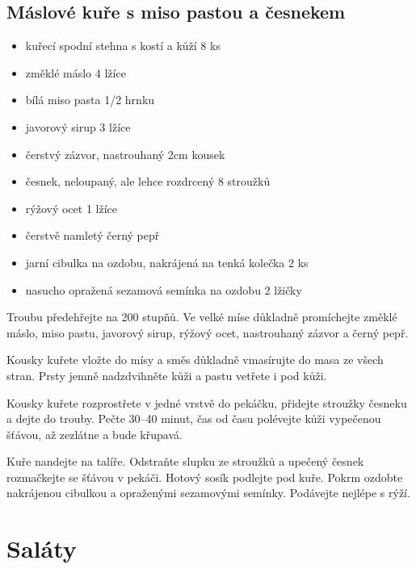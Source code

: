 \documentclass[10pt,a4paper]{article}
\newenvironment{myitemize}
{ \begin{itemize}
    \setlength{\itemsep}{0pt}
    \setlength{\parskip}{0pt}
    \setlength{\parsep}{0pt}     }
{ \end{itemize}                  }
\begin{document}
\subsection{Máslové kuře s miso pastou a česnekem}
\begin{minipage}[t]{0,5\textwidth}
\begin{myitemize} 
\item kuřecí spodní stehna s kostí a kůží 8 ks
\item změklé máslo 4 lžíce
\item bílá miso pasta 1/2 hrnku
\item javorový sirup 3 lžíce
\item čerstvý zázvor, nastrouhaný 2cm kousek
\item česnek, neloupaný, ale lehce rozdrcený 8 stroužků
\item rýžový ocet 1 lžíce
\item čerstvě namletý černý pepř
\item jarní cibulka na ozdobu, nakrájená na tenká kolečka 2 ks
\item nasucho opražená sezamová semínka na ozdobu 2 lžičky
\end{myitemize}
\end{minipage}
\begin{minipage}[t]{0,5\textwidth}
Troubu předehřejte na 200 stupňů. Ve velké míse důkladně promíchejte změklé máslo, miso pastu, javorový sirup, rýžový ocet, nastrouhaný zázvor a černý pepř.

Kousky kuřete vložte do mísy a směs důkladně vmasírujte do masa ze všech stran. Prsty jemně nadzdvihněte kůži a pastu vetřete i pod kůži.

Kousky kuřete rozprostřete v jedné vrstvě do pekáčku, přidejte stroužky česneku a dejte do trouby. Pečte 30–40 minut, čas od času polévejte kůži vypečenou šťávou, až zezlátne a bude křupavá.

Kuře nandejte na talíře. Odstraňte slupku ze stroužků a upečený česnek rozmačkejte se šťávou v pekáči. Hotový sosík podlejte pod kuře. Pokrm ozdobte nakrájenou cibulkou a opraženými sezamovými semínky. Podávejte nejlépe s rýží.
\end{minipage}
\pagebreak
\section{Saláty}
\end{document}
